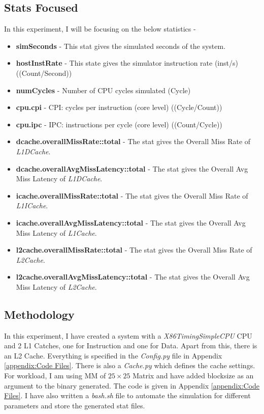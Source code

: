 \documentclass[10pt,a4paper]{article}
\begin{document}
\subsection{Stats Focused}
In this experiment, I will be focusing on the below statistics - 
\begin{itemize} 
\item \textbf{simSeconds} - This stat gives the simulated seconds of the system.
\item \textbf{hostInstRate} - This state gives the simulator instruction rate (inst/s) ((Count/Second))
\item \textbf{numCycles} - Number of CPU cycles simulated (Cycle)
\item \textbf{cpu.cpi} - CPI: cycles per instruction (core level) ((Cycle/Count))
\item \textbf{cpu.ipc} - IPC: instructions per cycle (core level) ((Count/Cycle))
\item \textbf{dcache.overallMissRate::total} - The stat gives the Overall Miss Rate of \emph{L1DCache}.
\item \textbf{dcache.overallAvgMissLatency::total} - The stat gives the Overall Avg Miss Latency of \emph{L1DCache}.
\item \textbf{icache.overallMissRate::total} - The stat gives the Overall Miss Rate of \emph{L1ICache}.
\item \textbf{icache.overallAvgMissLatency::total} - The stat gives the Overall Avg Miss Latency of \emph{L1Cache}.
\item \textbf{l2cache.overallMissRate::total} - The stat gives the Overall Miss Rate of \emph{L2Cache}.
\item \textbf{l2cache.overallAvgMissLatency::total} - The stat gives the Overall Avg Miss Latency of \emph{L2Cache}.
\end{itemize}
\subsection{Methodology}
In this experiment, I have created a system with a \emph{X86TimingSimpleCPU} CPU and 2 L1 Catches, one for Instruction and one for Data. Apart from this, there is an L2 Cache. Everything is specified in the \emph{Config.py} file in Appendix \ref{appendix:Code Files}. There is also a \emph{Cache.py} which defines the cache settings. For workload, I am using MM of $25 \times 25$ Matrix and have added blocksize as an argument to the binary generated. The code is given in Appendix \ref{appendix:Code Files}. I have also written a \emph{bash.sh} file to automate the simulation for different parameters and store the generated stat files.
\end{document}
